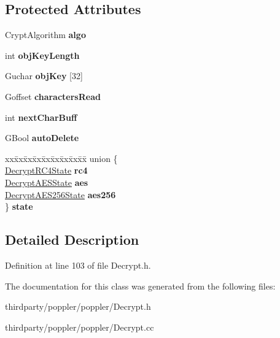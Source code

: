 \subsection*{Protected Attributes}
\begin{DoxyCompactItemize}
\item 
\mbox{\label{class_base_crypt_stream_a42b9a037ac6143b0852ffe1326c66b85}} 
Crypt\+Algorithm {\bfseries algo}
\item 
\mbox{\label{class_base_crypt_stream_a64df3c8b7841745e809a05859a8402d9}} 
int {\bfseries obj\+Key\+Length}
\item 
\mbox{\label{class_base_crypt_stream_a63efdf57716e1b03953de34fcce4cff3}} 
Guchar {\bfseries obj\+Key} \mbox{[}32\mbox{]}
\item 
\mbox{\label{class_base_crypt_stream_abc5996f5df875a3899d807008ecdbd72}} 
Goffset {\bfseries characters\+Read}
\item 
\mbox{\label{class_base_crypt_stream_ae23aab0e0b7192aeb541a0bfbd4185b0}} 
int {\bfseries next\+Char\+Buff}
\item 
\mbox{\label{class_base_crypt_stream_a6b9ca38b2c7626706a9d97b40b623214}} 
G\+Bool {\bfseries auto\+Delete}
\item 
\mbox{\label{class_base_crypt_stream_aa3ecb2a5b23230ef0850c673860f8a31}} 
\begin{tabbing}
xx\=xx\=xx\=xx\=xx\=xx\=xx\=xx\=xx\=\kill
union \{\\
\>\hyperlink{struct_decrypt_r_c4_state}{DecryptRC4State} {\bfseries rc4}\\
\>\hyperlink{struct_decrypt_a_e_s_state}{DecryptAESState} {\bfseries aes}\\
\>\hyperlink{struct_decrypt_a_e_s256_state}{DecryptAES256State} {\bfseries aes256}\\
\} {\bfseries state}\\

\end{tabbing}\end{DoxyCompactItemize}


\subsection{Detailed Description}


Definition at line 103 of file Decrypt.\+h.



The documentation for this class was generated from the following files\+:\begin{DoxyCompactItemize}
\item 
thirdparty/poppler/poppler/Decrypt.\+h\item 
thirdparty/poppler/poppler/Decrypt.\+cc\end{DoxyCompactItemize}

